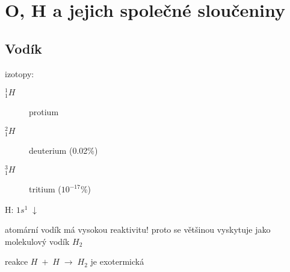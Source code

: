 \section{O, H a jejich společné sloučeniny}

\subsection{Vodík}

izotopy:
\begin{description}
    \item[$^1_1H$] protium
    \item[$^2_1H$] deuterium (0.02\%)
    \item[$^3_1H$] tritium ($10^{-17}$\%)
\end{description}

\smallskip

H: \(1s^1 \; \boxed{\downarrow\phantom{\uparrow}}\)

atomární vodík má vysokou reaktivitu! proto se většinou vyskytuje jako molekulový vodík $H_2$

reakce \(H \; + \; H \; \to \; H_2\) je exotermická